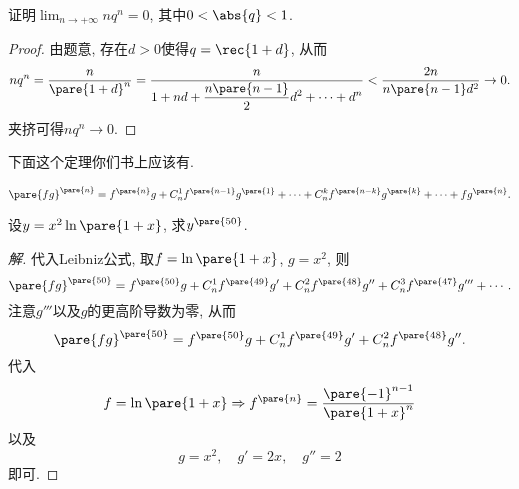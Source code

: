 \documentclass{ctexart}
\begin{document}
\begin{ex}
    证明$\displaystyle \lim_{n\rightarrow +\infty} nq^n = 0$, 其中$0<\abs{q}<1$.
\end{ex}
\begin{proof}
    由题意, 存在$d>0$使得$q = \displaystyle \rec{1+d}$, 从而
    \[ nq^n = \frac{n}{\pare{1+d}^n} = \frac{n}{1 + nd + \displaystyle \frac{n\pare{n-1}}{2}d^2 + \cdots + d^n} < \frac{2n}{n\pare{n-1}d^2} \rightarrow 0. \]
    夹挤可得$nq^n\rightarrow 0$.
\end{proof}
下面这个定理你们书上应该有.
\begin{theorem}[Leibniz公式]
    \[ \pare{fg}^{\pare{n}} = f^{\pare{n}}g + C_n^1 f^{\pare{n-1}}g^{\pare{1}} + \cdots + C_n^k f^{\pare{n-k}}g^{\pare{k}} + \cdots + fg^{\pare{n}}. \]
\end{theorem}
\begin{ex}
    设$y = x^2\ln\pare{1+x}$, 求$y^{\pare{50}}$.
\end{ex}
\begin{proof}[解]
    代入Leibniz公式, 取$f=\ln\pare{1+x}$, $g=x^2$, 则
    \[ \pare{fg}^{\pare{50}} = f^{\pare{50}}g + C_n^1 f^{\pare{49}}g' + C_n^2 f^{\pare{48}}g'' + C_n^3 f^{\pare{47}}g''' + \cdots. \]
    注意$g'''$以及$g$的更高阶导数为零, 从而
    \[ \pare{fg}^{\pare{50}} = f^{\pare{50}}g + C_n^1 f^{\pare{49}}g' + C_n^2 f^{\pare{48}}g''. \]
    代入
    \[ f = \ln \pare{1+x} \Rightarrow f^{\pare{n}} = \frac{\pare{-1}^{n-1}}{\pare{1+x}^{n}} \]
    以及
    \[ g = x^2,\quad g' = 2x,\quad g'' = 2 \]
    即可.
\end{proof}
\end{document}
